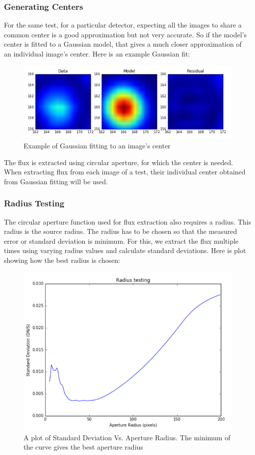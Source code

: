 \documentclass[conference]{IEEEtran}
\begin{document}
\subsubsection{Generating Centers}
For the same test, for a particular detector, expecting all the images to share a common center is a good approximation but not very accurate. So if the model's center is fitted to a Gaussian model, that gives a much closer approximation of an individual image's center. Here is an example Gaussian fit:
\begin{figure}[H]
\includegraphics[scale=0.5]{Gaussian}
\caption{Example of Gaussian fitting to an image's center}
\end{figure}
The flux is extracted using circular aperture, for which the center is needed. When extracting flux from each image of a test, their individual center obtained from Gaussian fitting will be used.  

\subsubsection{Radius Testing}
The circular aperture function used for flux extraction also requires a radius. This radius is the source radius. The radius has to be chosen so that the measured error or standard deviation is minimum. For this, we extract the flux multiple times using varying radius values and calculate standard deviations. Here is plot showing how the best radius is chosen:
\begin{figure}[H]
\includegraphics[scale=0.5]{Radius}
\caption{A plot of Standard Deviation Vs. Aperture Radius. The minimum of the curve gives the best aperture radius}
\end{figure}
\end{document}
